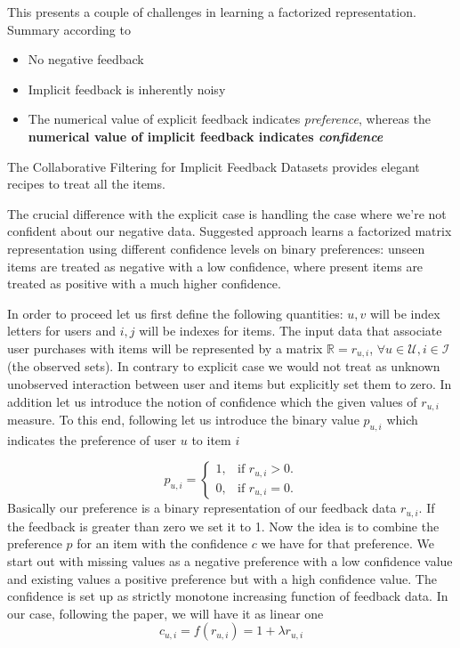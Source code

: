 \documentclass[12pt]{article}
\begin{document}
This presents a couple of challenges in learning a factorized representation. Summary according to \cite{CFIFD}
\begin{itemize}
\item No negative feedback
\item Implicit feedback is inherently noisy
\item The numerical value of explicit feedback indicates {\it preference}, whereas the {\textbf{numerical value of implicit feedback indicates {\it confidence}}}
\end{itemize}

The Collaborative Filtering for Implicit Feedback Datasets provides elegant recipes to treat all the items.

The crucial difference with the explicit case is handling the case where we're not confident about our negative data. Suggested approach learns a factorized matrix representation using different confidence levels on binary preferences: unseen items are treated as negative with a low confidence, where present items are treated as positive with a much higher confidence.

In order to proceed let us first define the following quantities: $u,v$ will be index letters for users and $i, j$ will be indexes for items. The input data that associate user purchases with items will be represented by a matrix $\mathbb{R} = {r_{u,i}}$, $\forall u \in \mathcal{U}, i \in \mathcal{I}$  (the observed sets). In contrary to explicit case we would not treat as unknown unobserved interaction between user and items but explicitly set them to zero. In addition let us introduce the notion of confidence which the given values of $r_{u,i}$ measure. To this end, following \cite{CFIFD} let us introduce the binary value $p_{u,i}$ which indicates the preference of user $u$ to item $i$

\begin{equation}
p_{u,i} = \begin{cases}
    1, & \text{if $r_{u,i}>0$}.\\
    0, & \text{if $r_{u,i}=0$}.
  \end{cases}
\end{equation}
Basically our preference is a binary representation of our feedback data $r_{u,i}$. If the feedback is greater than zero we set it to 1.
Now the idea is to combine the preference $p$ for an item with the confidence $c$ we have for that preference. We start out with missing values as a negative preference with a low confidence value and existing values a positive preference but with a high confidence value. The confidence is set up as strictly monotone increasing function of feedback data. In our case, following the paper, we will have it as linear one
\begin{equation}
c_{u,i} = f(r_{u,i}) = 1 + \lambda r_{u,i}
\end{equation}
\end{document}
